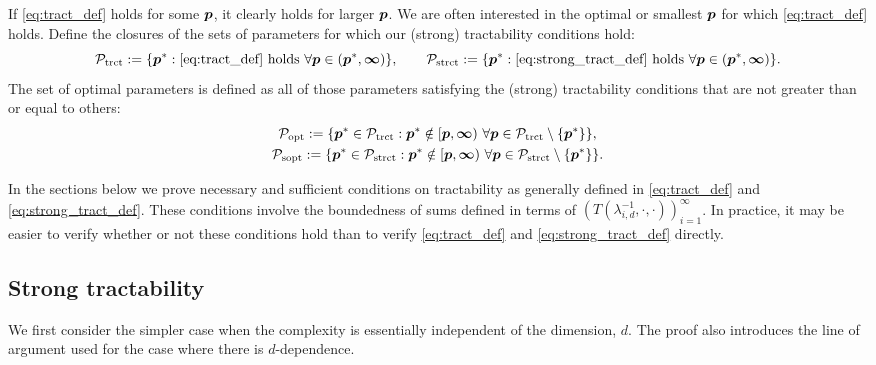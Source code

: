 \documentclass[11pt,a4paper]{article}
\begin{document}
If \eqref{eq:tract_def} holds for some $\boldsymbol{p}$, it clearly holds for larger $\boldsymbol{p}$.  We are often interested in the optimal or smallest $\boldsymbol{p}$ for which \eqref{eq:tract_def} holds.  Define the closures of the sets of parameters for which our (strong) tractability conditions hold:
\begin{equation*}
	\mathcal{P}_{\textup{trct}} : = \{\boldsymbol{p}^* : \eqref{eq:tract_def} \text{ holds }\forall \boldsymbol{p} \in (\boldsymbol{p}^*,\boldsymbol{\infty})\}, \qquad
	\mathcal{P}_{\textup{strct}} : = \{\boldsymbol{p}^* : \eqref{eq:strong_tract_def} \text{ holds }\forall \boldsymbol{p} \in (\boldsymbol{p}^*,\boldsymbol{\infty})\}.
\end{equation*}
The  set of optimal parameters is defined as all of those parameters satisfying the (strong) tractability conditions that are not greater than or equal to others:
\begin{gather}
	\label{eq:Poptdef}
	\mathcal{P}_{\textup{opt}} : = \{\boldsymbol{p}^* \in \mathcal{P}_{\textup{trct}} :  \boldsymbol{p}^* \notin [\boldsymbol{p},\boldsymbol{\infty}) \ \forall \boldsymbol{p} \in  \mathcal{P}_{\textup{trct}} \setminus \{\boldsymbol{p}^*\} \}, \\
	\label{eq:Psoptdef}
	\mathcal{P}_{\textup{sopt}} : = \{\boldsymbol{p}^* \in \mathcal{P}_{\textup{strct}} :  \boldsymbol{p}^* \notin [\boldsymbol{p},\boldsymbol{\infty}) \ \forall \boldsymbol{p} \in  \mathcal{P}_{\textup{strct}} \setminus \{\boldsymbol{p}^*\} \}.
\end{gather}

In the sections below we prove necessary and sufficient conditions on tractability as generally defined in \eqref{eq:tract_def} and \eqref{eq:strong_tract_def}.  These conditions involve the boundedness of sums defined in terms of $(T(\lambda_{i,d}^{-1},\cdot, \cdot))_{i=1}^\infty$.  In practice, it may be easier to verify whether or not these conditions hold than to verify \eqref{eq:tract_def} and \eqref{eq:strong_tract_def} directly.




\subsection{Strong tractability}

We first consider the simpler case when the complexity is essentially independent of the dimension, $d$.  The proof also introduces the line of argument used for the case where there is $d$-dependence.
\end{document}
